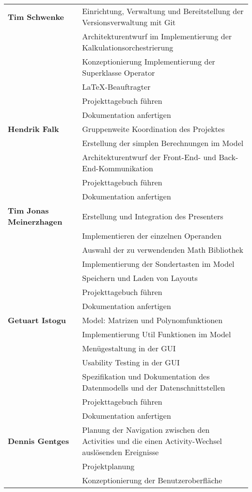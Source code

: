 {\begin{longtable}{|l|p{26em}|}
		\textbf{Tim Schwenke} 
		& Einrichtung, Verwaltung und Bereitstellung der Versionsverwaltung mit Git \\
		& Architekturentwurf im Implementierung der Kalkulationsorchestrierung \\
		& Konzeptionierung Implementierung der Superklasse Operator \\
		& LaTeX-Beauftragter \\
		& Projekttagebuch führen \\
		& Dokumentation anfertigen \\
		\hline
		\textbf{Hendrik Falk}
		& Gruppenweite Koordination des Projektes \\
		& Erstellung der simplen Berechnungen im Model \\
		& Architekturentwurf der Front-End- und Back-End-Kommunikation \\
		& Projekttagebuch führen \\
		& Dokumentation anfertigen \\
		\hline
		\textbf{Tim Jonas Meinerzhagen}
		& Erstellung und Integration des Presenters \\
		& Implementieren der einzelnen Operanden \\
		& Auswahl der zu verwendenden Math Bibliothek \\
		& Implementierung der Sondertasten im Model \\
		& Speichern und Laden von Layouts \\
		& Projekttagebuch führen \\
		& Dokumentation anfertigen \\
		\hline
		\textbf{Getuart Istogu}
		& Model: Matrizen und Polynomfunktionen \\
		& Implementierung Util Funktionen im Model \\
		& Menügestaltung in der GUI \\
		& Usability Testing in der GUI \\
		& Spezifikation und Dokumentation des Datenmodells und der Datenschnittstellen \\
		& Projekttagebuch führen \\
		& Dokumentation anfertigen \\
		\hline
		\textbf{Dennis Gentges}
		& Planung der Navigation zwischen den Activities und die einen Activity-Wechsel auslösenden Ereignisse \\
		& Projektplanung \\
		& Konzeptionierung der Benutzeroberfläche \\

\end{longtable}}
